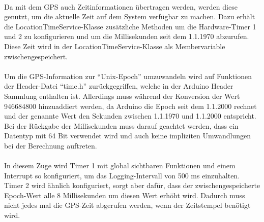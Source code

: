 \paragraph{}
Da mit dem GPS auch Zeitinformationen übertragen werden, werden diese genutzt, um die aktuelle Zeit auf dem System verfügbar zu machen. Dazu erhält die LocationTimeService-Klasse zusätzliche Methoden um die Hardware-Timer 1 und 2 zu konfigurieren und um die Millisekunden seit dem 1.1.1970 abzurufen. Diese Zeit wird in der LocationTimeService-Klasse als Membervariable zwischengespeichert.
\paragraph{}
Um die GPS-Information zur \enquote{Unix-Epoch} umzuwandeln wird auf Funktionen der Header-Datei \enquote{time.h} zurückgegriffen, welche in der Arduino Header Sammlung enthalten ist. Allerdings muss während der Konversion der Wert 946684800 hinzuaddiert werden, da Arduino die Epoch seit dem 1.1.2000 rechnet und der genannte Wert den Sekunden zwischen 1.1.1970 und 1.1.2000 entspricht. Bei der Rückgabe der Millisekunden muss darauf geachtet werden, dass ein Datentyp mit 64 Bit verwendet wird und auch keine impliziten Umwandlungen bei der Berechnung auftreten.
\paragraph{}
In diesem Zuge wird Timer 1 mit global sichtbaren Funktionen und einem Interrupt so konfiguriert, um das Logging-Intervall von 500 ms einzuhalten. Timer 2 wird ähnlich konfiguriert, sorgt aber dafür, dass der zwischengespeicherte Epoch-Wert alle 8 Millisekunden um diesen Wert erhöht wird. Dadurch muss nicht jedes mal die GPS-Zeit abgerufen werden, wenn der Zeitstempel benötigt wird.

